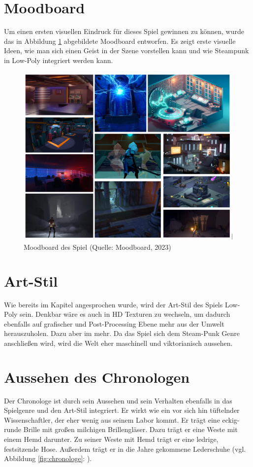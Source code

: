 \section{Moodboard}\label{sec:moodboard}
Um einen ersten visuellen Eindruck für dieses Spiel gewinnen  zu können, wurde das in Abbildung \ref{fig:moodboard} abgebildete Moodboard entworfen. Es zeigt erste visuelle Ideen, wie man sich einen Geist in der Szene vorstellen kann und wie Steampunk in Low-Poly integriert werden kann.

\begin{figure}[ht]
\centering
\includegraphics[width=0.8\linewidth]{content/pictures/Game_Atmo.jpg}
\caption{Moodboard des Spiel (Quelle: Moodboard, 2023)}
\label{fig:moodboard}
\end{figure}


\section{Art-Stil}
Wie bereits im Kapitel  angesprochen wurde, wird der Art-Stil des Spiels Low-Poly sein. Denkbar wäre es auch in \ac{HD} Texturen zu wechseln, um dadurch ebenfalls auf grafischer und Post-Processing Ebene mehr aus der Umwelt herauszuholen. Dazu aber im  mehr. Da das Spiel sich dem Steam-Punk Genre anschließen wird, wird die Welt eher maschinell und viktorianisch aussehen.

\section{Aussehen des Chronologen}
Der Chronologe ist durch sein Aussehen und sein Verhalten ebenfalls in das Spielgenre und den Art-Stil integriert. Er wirkt wie ein vor sich hin tüftelnder Wissenschaftler, der eher wenig aus seinem Labor kommt. Er trägt eine eckig-runde Brille mit großen milchigen Brillengläser. Dazu trägt er eine Weste mit einem Hemd darunter. Zu seiner Weste mit Hemd trägt er eine ledrige, festsitzende Hose. Außerdem trägt er in die Jahre gekommene Lederschuhe (vgl. Abbildung \ref{fig:chronologe}: ).

